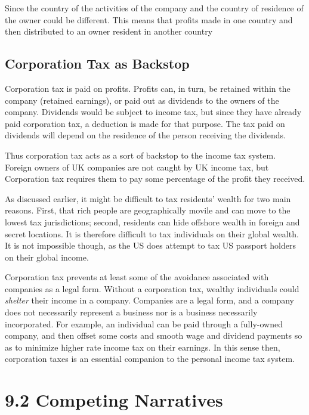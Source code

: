 \documentclass[]{tufte-handout}
\begin{document}
Since the country of the activities of the company and the country of
residence of the owner could be different. This means that profits made
in one country and then distributed to an owner resident in another
country

\hypertarget{corporation-tax-as-backstop}{%
\subsection{Corporation Tax as
Backstop}\label{corporation-tax-as-backstop}}

Corporation tax is paid on profits. Profits can, in turn, be retained
within the company (retained earnings), or paid out as dividends to the
owners of the company. Dividends would be subject to income tax, but
since they have already paid corporation tax, a deduction is made for
that purpose. The tax paid on dividends will depend on the residence of
the person receiving the dividends.

Thus corporation tax acts as a sort of backstop to the income tax
system. Foreign owners of UK companies are not caught by UK income tax,
but Corporation tax requires them to pay some percentage of the profit
they received.

As discussed earlier, it might be difficult to tax residents' wealth for
two main reasons. First, that rich people are geographically movile and
can move to the lowest tax jurisdictions; second, residents can hide
offshore wealth in foreign and secret locations. It is therefore
difficult to tax individuals on their global wealth. It is not
impossible though, as the US does attempt to tax US passport holders on
their global income.

Corporation tax prevents at least some of the avoidance associated with
companies as a legal form. Without a corporation tax, wealthy
individuals could \emph{shelter} their income in a company. Companies
are a legal form, and a company does not necessarily represent a
business nor is a business necessarily incorporated. For example, an
individual can be paid through a fully-owned company, and then offset
some costs and smooth wage and dividend payments so as to minimize
higher rate income tax on their earnings. In this sense then,
corporation taxes is an essential companion to the personal income tax
system.

\hypertarget{competing-narratives}{%
\section{9.2 Competing Narratives}\label{competing-narratives}}
\end{document}
